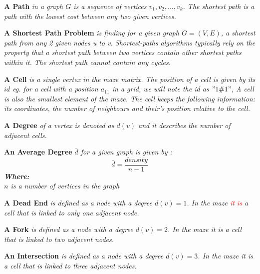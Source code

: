 \begin{definition}\textbf{A Path } \emph{in a graph $G$ is a sequence of vertices $v_1, v_2,\ldots,v_k$. The shortest path is a path with the lowest cost between any two given vertices.\cite{Erickson}}\end{definition}
\begin{definition}\textbf{A Shortest Path Problem } \emph{is finding for a given graph $G = (V,E)$, a shortest path from any 2 given nodes \textit{u} to \textit{v}. Shortest-paths algorithms typically rely on the property that a shortest path between two vertices contain other shortest paths within it.
The shortest path cannot contain any cycles.\cite{Trudeau}}\end{definition}
\begin{definition}\textbf{A Cell} \emph{is a single vertex in the maze matrix. The position of a cell is given by its $id$ eg. for a cell with a position $a_{11}$ in a grid, we will note the id as $"1\char"0023 1"$, A cell is also the smallest element of the maze. The cell keeps the following information: its coordinates, the number of neighbours and their’s position relative to the cell.}\end{definition}
\begin{definition}\textbf{A Degree } \emph{of a vertex is denoted as $d(v)$ and it describes the number of adjacent cells.\cite{Hofstad}}\end{definition}
\begin{definition}\textbf{An Average Degree }\emph{ $\bar{d}$ for a given graph is given by \cite{Hofstad}:\\
\begin{equation}
\bar{d} = \frac{density}{n-1}	
\end{equation}
\textbf{Where:}\\
$n$ is a number of vertices in the graph\\	
}\end{definition}
\begin{definition}\textbf{A Dead End} \emph{ is defined as a node with a degree $d(v) = 1$. In the maze \textcolor{red}{it is} a cell that is linked to only one adjacent node.}\end{definition}
\begin{definition}\textbf{A Fork} \emph{is defined as a node with a degree $d(v) = 2$. In the maze it is a cell that is linked to two adjacent nodes.}\end{definition}
\begin{definition}\textbf{An Intersection} \emph{ is defined as a node with a degree $d(v) = 3$. In the maze it is a cell that is linked to three adjacent nodes.}\end{definition}

